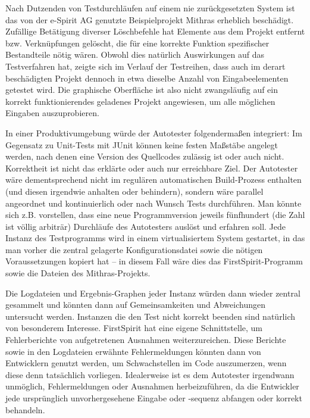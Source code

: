 Nach Dutzenden von Testdurchläufen auf einem nie zurückgesetzten System
ist das von der e-Spirit AG genutzte Beispielprojekt \glqq{}Mithras\grqq{}
erheblich beschädigt. Zufällige Betätigung diverser Löschbefehle hat
Elemente aus dem Projekt entfernt bzw. Verknüpfungen gelöscht, die für
eine korrekte Funktion spezifischer Bestandteile nötig wären. Obwohl
dies natürlich Auswirkungen auf das Testverfahren hat, zeigte sich im 
Verlauf der Testreihen, dass auch im derart beschädigten Projekt 
dennoch in etwa dieselbe Anzahl von Eingabeelementen getestet wird.
Die graphische Oberfläche ist also nicht zwangsläufig auf ein korrekt funktionierendes
geladenes Projekt angewiesen, um alle möglichen Eingaben auszuprobieren.

In einer Produktivumgebung würde der Autotester folgendermaßen integriert:
Im Gegensatz zu Unit-Tests mit JUnit können keine festen Maßstäbe angelegt
werden, nach denen eine Version des Quellcodes zulässig ist oder auch nicht.
Korrektheit ist nicht das erklärte oder auch nur erreichbare Ziel.
Der Autotester wäre dementsprechend nicht im regulären automatischen
Build-Prozess enthalten (und diesen irgendwie anhalten oder behindern),
sondern wäre parallel angeordnet und kontinuierlich oder nach Wunsch
Tests durchführen. Man könnte sich z.B. vorstellen, dass eine neue
Programmversion jeweils fünfhundert (die Zahl ist völlig arbiträr) Durchläufe
des Autotesters auslöst und erfahren soll. Jede Instanz des Testprogramms wird
in einem virtualisiertem System gestartet, in das man vorher die
zentral gelagerte Konfigurationsdatei sowie die nötigen Voraussetzungen
kopiert hat -- in diesem Fall wäre dies das FirstSpirit-Programm sowie
die Dateien des Mithras-Projekts.

Die Logdateien und Ergebnis-Graphen jeder Instanz würden dann wieder zentral
gesammelt und könnten dann auf Gemeinsamkeiten und Abweichungen untersucht
werden. Instanzen die den Test nicht korrekt beenden sind natürlich von besonderem
Interesse. FirstSpirit hat eine eigene Schnittstelle, um Fehlerberichte von
aufgetretenen Ausnahmen weiterzureichen. Diese Berichte sowie in den Logdateien
erwähnte Fehlermeldungen könnten dann von Entwicklern genutzt werden, um
Schwachstellen im Code auszumerzen, wenn diese denn tatsächlich vorliegen.
Idealerweise ist es dem Autotester irgendwann unmöglich, Fehlermeldungen
oder Ausnahmen herbeizuführen, da die Entwickler jede ursprünglich 
unvorhergesehene Eingabe oder -sequenz abfangen oder korrekt behandeln.


